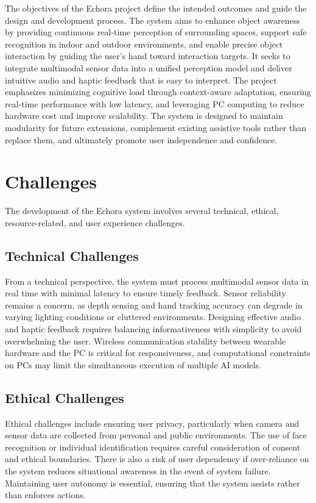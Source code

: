 The objectives of the Echora project define the intended outcomes and guide the design and development process. The system aims to enhance object awareness by providing continuous real-time perception of surrounding spaces, support safe recognition in indoor and outdoor environments, and enable precise object interaction by guiding the user’s hand toward interaction targets. It seeks to integrate multimodal sensor data into a unified perception model and deliver intuitive audio and haptic feedback that is easy to interpret. The project emphasizes minimizing cognitive load through context-aware adaptation, ensuring real-time performance with low latency, and leveraging PC computing to reduce hardware cost and improve scalability. The system is designed to maintain modularity for future extensions, complement existing assistive tools rather than replace them, and ultimately promote user independence and confidence.

\section{Challenges}
\label{subsec:challenges}

The development of the Echora system involves several technical, ethical, resource-related, and user experience challenges.

\subsection{Technical Challenges}
\label{subsubsec:technical_challenges}

From a technical perspective, the system must process multimodal sensor data in real time with minimal latency to ensure timely feedback. Sensor reliability remains a concern, as depth sensing and hand tracking accuracy can degrade in varying lighting conditions or cluttered environments. Designing effective audio and haptic feedback requires balancing informativeness with simplicity to avoid overwhelming the user. Wireless communication stability between wearable hardware and the PC is critical for responsiveness, and computational constraints on PCs may limit the simultaneous execution of multiple AI models.

\subsection{Ethical Challenges}
\label{subsubsec:ethical_challenges}

Ethical challenges include ensuring user privacy, particularly when camera and sensor data are collected from personal and public environments. The use of face recognition or individual identification requires careful consideration of consent and ethical boundaries. There is also a risk of user dependency if over-reliance on the system reduces situational awareness in the event of system failure. Maintaining user autonomy is essential, ensuring that the system assists rather than enforces actions.

